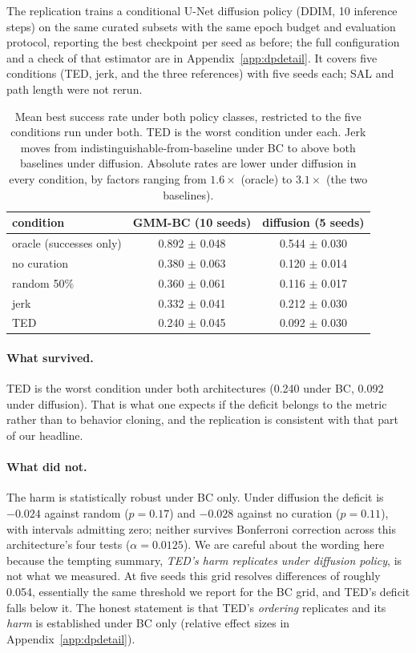 \documentclass[10pt]{article}
\begin{document}
The replication trains a conditional U-Net diffusion policy (DDIM, 10
inference steps) on the same curated subsets with the same epoch budget and
evaluation protocol, reporting the best checkpoint per seed as before; the
full configuration and a check of that estimator are in
Appendix~\ref{app:dpdetail}. It covers five conditions (TED, jerk, and the
three references) with five seeds each; SAL and path length were not rerun.

\begin{table}[t]
\centering
\small
\begin{tabular}{lcc}
\toprule
condition & GMM-BC (10 seeds) & diffusion (5 seeds) \\
\midrule
oracle (successes only) & 0.892 $\pm$ 0.048 & 0.544 $\pm$ 0.030 \\
\midrule
no curation             & 0.380 $\pm$ 0.063 & 0.120 $\pm$ 0.014 \\
random 50\%             & 0.360 $\pm$ 0.061 & 0.116 $\pm$ 0.017 \\
\midrule
jerk                    & 0.332 $\pm$ 0.041 & 0.212 $\pm$ 0.030 \\
TED                     & 0.240 $\pm$ 0.045 & 0.092 $\pm$ 0.030 \\
\bottomrule
\end{tabular}
\caption{Mean best success rate under both policy classes, restricted to the
five conditions run under both. TED is the worst condition under each. Jerk
moves from indistinguishable-from-baseline under BC to above both baselines
under diffusion. Absolute rates are lower under diffusion in every
condition, by factors ranging from $1.6\times$ (oracle) to $3.1\times$ (the
two baselines).}
\label{tab:crossarch}
\end{table}

\paragraph{What survived.} TED is the worst condition under both
architectures (0.240 under BC, 0.092 under diffusion). That is what one
expects if the deficit belongs to the metric rather than to behavior
cloning, and the replication is consistent with that part of our headline.

\paragraph{What did not.} The harm is statistically robust under BC only.
Under diffusion the deficit is $-0.024$ against random ($p = 0.17$) and
$-0.028$ against no curation ($p = 0.11$), with intervals admitting zero;
neither survives Bonferroni correction across this architecture's four
tests ($\alpha = 0.0125$).
We are careful about the wording here because the tempting summary,
\emph{TED's harm replicates under diffusion policy}, is not what we
measured. At five seeds this grid resolves differences of roughly 0.054,
essentially the same threshold we report for the BC grid, and TED's deficit
falls below it. The honest statement is that TED's \emph{ordering}
replicates and its \emph{harm} is established under BC only
(relative effect sizes in Appendix~\ref{app:dpdetail}).
\end{document}

